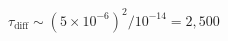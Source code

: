 \documentclass[preview]{standalone}
\begin{document}
$\tau_\text{diff} \sim (5 \times 10^{-6})^2 / 10^{-14} = 2{,}500$
\end{document}
